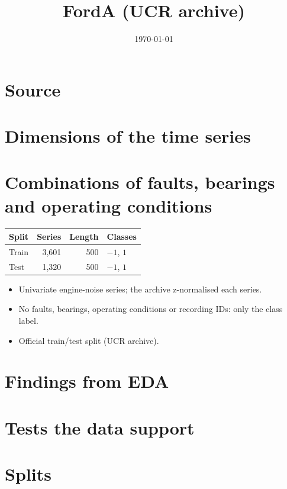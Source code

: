 \documentclass[11pt,a4paper]{article}
\title{FordA (UCR archive)}
\author{}
\date{\today}
\begin{document}
\maketitle

\section{Source}

\section{Dimensions of the time series}

\section{Combinations of faults, bearings and operating conditions}

\begin{table}[h]
\centering
\small
\begin{tabular}{lrrl}
\toprule
Split & Series & Length & Classes \\
\midrule
Train & 3,601 & 500 & $-1$, $1$ \\
Test  & 1,320 & 500 & $-1$, $1$ \\
\bottomrule
\end{tabular}
\end{table}

\begin{itemize}
  \item Univariate engine-noise series; the archive z-normalised each series.
  \item No faults, bearings, operating conditions or recording IDs: only the class label.
  \item Official train/test split (UCR archive).
\end{itemize}

\section{Findings from EDA}

\section{Tests the data support}

\section{Splits}
\end{document}

